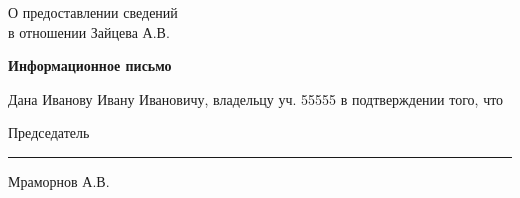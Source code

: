 \begin{flushleft}
О предоставлении сведений\\
в отношении Зайцева  А.В.
\end{flushleft}
\vspace{10mm}
\begin{center}
	\Large\textbf{Информационное письмо}
\end{center}
\par

Дана Иванову Ивану Ивановичу, владельцу уч. 55555 в подтверждении того, что 

\vspace{35mm}
Председатель \hfill    \rule{4cm}{0.1 mm}    Мраморнов А.В.




